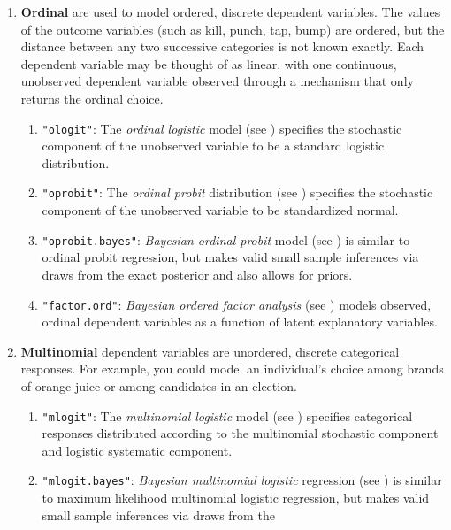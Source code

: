 \begin{enumerate}
\begin{enumerate}
(see ) takes multiple dichotomous dependent variables and models
them as a function of $k$ latent (unobserved) explanatory variables.  
\end{enumerate} 
 \item {\bf  Ordinal} are used to model
   ordered, discrete dependent variables.  The values of the outcome
   variables (such as kill, punch, tap, bump) are ordered, but the
   distance between any two successive categories is not known
   exactly.  Each dependent variable may be thought of as linear, with
one continuous, unobserved dependent variable observed through a mechanism
   that only returns the ordinal choice.
   \begin{enumerate}
   \item {\tt "ologit"}: The {\it ordinal logistic} model (see
     ) specifies the stochastic component of the
     unobserved variable to be a standard logistic distribution.
   \item {\tt "oprobit"}: The {\it ordinal probit} distribution (see
     ) specifies the stochastic component of the
     unobserved variable to be standardized normal.
      \item {\tt "oprobit.bayes"}: {\it Bayesian ordinal probit} model
(see ) is similar to ordinal probit
regression, but makes valid small sample inferences via draws from the
exact posterior and also allows for priors.  
     \item {\tt "factor.ord"}: {\it Bayesian ordered factor analysis}
(see ) models observed, ordinal dependent variables
as a function of latent explanatory variables.  
   \end{enumerate}
 \item {\bf Multinomial} dependent variables are unordered, discrete
   categorical responses.  For example, you could model an
   individual's choice among brands of orange juice or among
   candidates in an election.
    \begin{enumerate}
    \item {\tt "mlogit"}: The {\it multinomial logistic} model (see
      ) specifies categorical responses distributed
      according to the multinomial stochastic component and logistic
      systematic component.
    \item {\tt "mlogit.bayes"}: {\it Bayesian multinomial logistic} regression (see
) is similar to maximum likelihood multinomial logistic
regression, but makes valid small sample inferences via draws from the

\end{enumerate}
\end{enumerate}
